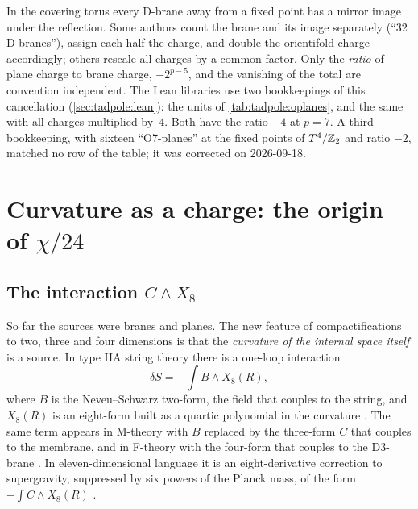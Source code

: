 \begin{pitfallbox}
In the covering torus every D-brane away from a fixed point has a mirror image under the
reflection. Some authors count the brane and its image separately (``32 D-branes''), assign
each half the charge, and double the orientifold charge accordingly; others rescale all
charges by a common factor. Only the \emph{ratio} of plane charge to brane charge,
$-2^{p-5}$, and the vanishing of the total are convention independent. The Lean libraries use
two bookkeepings of this cancellation (\cref{sec:tadpole:lean}): the units of
\cref{tab:tadpole:oplanes}, and the same with all charges multiplied by~$4$. Both have the ratio
$-4$ at $p=7$. A third bookkeeping, with sixteen ``O7-planes'' at the fixed points of $T^4/\mathbb{Z}_2$
and ratio $-2$, matched no row of the table; it was corrected on 2026-09-18.
\end{pitfallbox}

\section{Curvature as a charge: the origin of \texorpdfstring{$\chi/24$}{chi/24}}
\label{sec:tadpole:chi24}

\subsection{The interaction \texorpdfstring{$C\wedge X_8$}{C X8}}
So far the sources were branes and planes. The new feature of compactifications to two, three
and four dimensions is that the \emph{curvature of the internal space itself} is a source.
In type IIA string theory there is a one-loop interaction
\begin{equation}\label{eq:tadpole:BX8}
 \delta S=-\int B\wedge X_8(R),
\end{equation}
where $B$ is the Neveu--Schwarz two-form, the field that couples to the string, and $X_8(R)$
is an eight-form built as a quartic polynomial in the curvature
. The same term appears in M-theory with $B$ replaced
by the three-form $C$ that couples to the membrane, and in F-theory with the four-form that
couples to the D3-brane . In eleven-dimensional language it is an
eight-derivative correction to supergravity, suppressed by six powers of the Planck mass,
of the form $-\int C\wedge X_8(R)$ .

